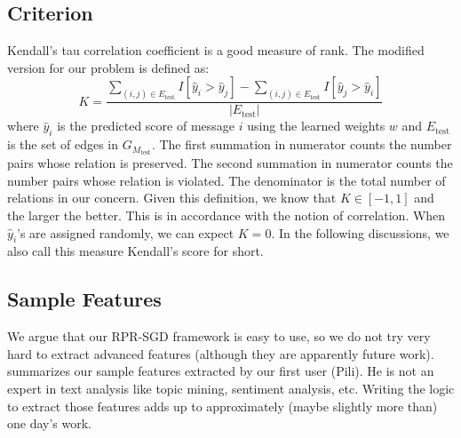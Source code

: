 \documentclass{sig-alternate}
\begin{document}
\subsection{Criterion}
\label{sec:Criterion}

Kendall's tau correlation coefficient \cite{wiki_kendall} is a good measure of rank. 
The modified version for our problem is defined as:
\begin{equation}
	K = \frac{
	\sum_{(i,j) \in {E_{\text{test}}} }{I[\hat{y}_i>\hat{y}_j]} 
	- \sum_{(i,j)\in {E_{\text{test}}} }{I[\hat{y}_j>\hat{y}_i]}  }
	{|E_{\text{test}}|}
\end{equation}
where $\hat{y}_i$ is the predicted score of message $i$ using the learned weights $w$
and $E_{\text{test}}$ is the set of edges in $G_{M_{\text{test}}}$. 
The first summation in numerator counts the number pairs whose relation is preserved. 
The second summation in numerator counts the number pairs whose relation is violated. 
The denominator is the total number of relations in our concern. 
Given this definition, we know that $K \in [-1, 1]$ and the larger the better. 
This is in accordance with the notion of correlation. 
When $\hat{y}_i$'s are assigned randomly, we can expect $K = 0$. 
In the following discussions, we also call this measure Kendall's score for short. 

\subsection{Sample Features}
\label{sec:Sample Features}

We argue that our RPR-SGD framework is easy to use, 
so we do not try very hard to extract advanced features
(although they are apparently future work). 
\rtbl{\ref{tbl:feature}} summarizes our sample features extracted by our first user (Pili). 
He is not an expert in text analysis like topic mining, sentiment analysis, etc. 
Writing the logic to extract those features adds up to 
approximately (maybe slightly more than) one day's work. 
\end{document}
